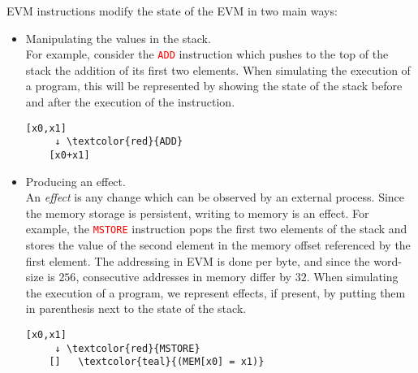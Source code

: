EVM instructions modify the state of the EVM in two main ways:
\begin{itemize}
    \item Manipulating the values in the stack. \\
    For example, consider the \textcolor{red}{\texttt{ADD}} instruction which
    pushes to the top of the stack the addition of its first two elements.
    When simulating the execution of a program, this will be represented by
    showing the state of the stack before and after the execution of the 
    instruction. 
    \begin{Verbatim}[commandchars=\\\{\}]
    [x0,x1] 
     ↓ \textcolor{red}{ADD}
    [x0+x1]
    \end{Verbatim}

    \item Producing an effect. \\
    An \emph{effect} is any change which can be observed by an external process.
    Since the memory storage is persistent, writing to memory is an effect.
    For example, the \textcolor{red}{\texttt{MSTORE}} instruction pops the
    first two elements of the stack and stores the value of the second
    element in the memory offset referenced by the first element. The addressing
    in EVM is done per byte, and since the word-size is $256$, consecutive addresses
    in memory differ by $32$. When simulating the execution of a program, we 
    represent effects, if present, by putting them in parenthesis next to the state 
    of the stack.
    \begin{Verbatim}[commandchars=\\\{\}]
    [x0,x1]
     ↓ \textcolor{red}{MSTORE}
    []   \textcolor{teal}{(MEM[x0] = x1)}
    \end{Verbatim}
\end{itemize}


